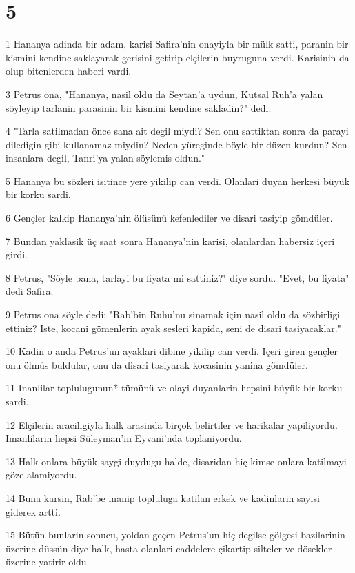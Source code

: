 \chapter{5}

\par 1 Hananya adinda bir adam, karisi Safira'nin onayiyla bir mülk satti, paranin bir kismini kendine saklayarak gerisini getirip elçilerin buyruguna verdi. Karisinin da olup bitenlerden haberi vardi.
\par 3 Petrus ona, "Hananya, nasil oldu da Seytan'a uydun, Kutsal Ruh'a yalan söyleyip tarlanin parasinin bir kismini kendine sakladin?" dedi.
\par 4 "Tarla satilmadan önce sana ait degil miydi? Sen onu sattiktan sonra da parayi diledigin gibi kullanamaz miydin? Neden yüreginde böyle bir düzen kurdun? Sen insanlara degil, Tanri'ya yalan söylemis oldun."
\par 5 Hananya bu sözleri isitince yere yikilip can verdi. Olanlari duyan herkesi büyük bir korku sardi.
\par 6 Gençler kalkip Hananya'nin ölüsünü kefenlediler ve disari tasiyip gömdüler.
\par 7 Bundan yaklasik üç saat sonra Hananya'nin karisi, olanlardan habersiz içeri girdi.
\par 8 Petrus, "Söyle bana, tarlayi bu fiyata mi sattiniz?" diye sordu. "Evet, bu fiyata" dedi Safira.
\par 9 Petrus ona söyle dedi: "Rab'bin Ruhu'nu sinamak için nasil oldu da sözbirligi ettiniz? Iste, kocani gömenlerin ayak sesleri kapida, seni de disari tasiyacaklar."
\par 10 Kadin o anda Petrus'un ayaklari dibine yikilip can verdi. Içeri giren gençler onu ölmüs buldular, onu da disari tasiyarak kocasinin yanina gömdüler.
\par 11 Inanlilar toplulugunun* tümünü ve olayi duyanlarin hepsini büyük bir korku sardi.
\par 12 Elçilerin araciligiyla halk arasinda birçok belirtiler ve harikalar yapiliyordu. Imanlilarin hepsi Süleyman'in Eyvani'nda toplaniyordu.
\par 13 Halk onlara büyük saygi duydugu halde, disaridan hiç kimse onlara katilmayi göze alamiyordu.
\par 14 Buna karsin, Rab'be inanip topluluga katilan erkek ve kadinlarin sayisi giderek artti.
\par 15 Bütün bunlarin sonucu, yoldan geçen Petrus'un hiç degilse gölgesi bazilarinin üzerine düssün diye halk, hasta olanlari caddelere çikartip silteler ve dösekler üzerine yatirir oldu.
